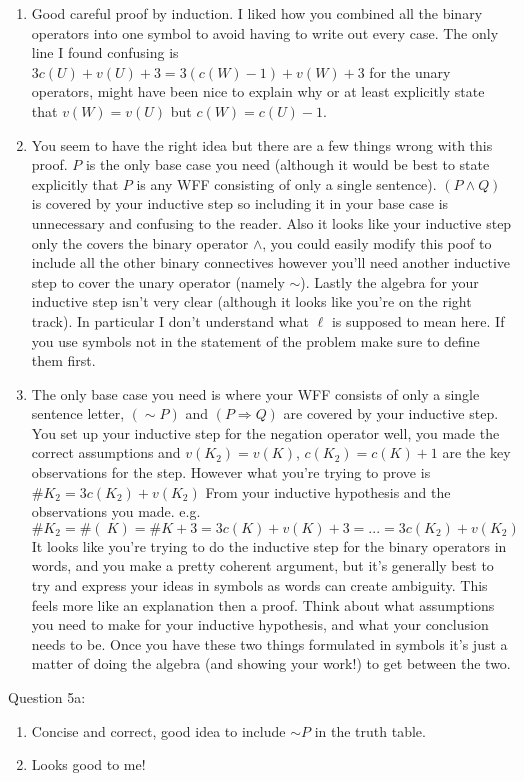 \documentclass[11pt] {article}
\begin{document}
\begin{enumerate}
\item Good careful proof by induction. I liked how you combined all the binary operators into one symbol to avoid having to write out every case. The only line I found confusing is $3c(U) + v(U) + 3 = 3(c(W)-1) + v(W) + 3$ for the unary operators, might have been nice to explain why or at least explicitly state that $v(W) = v(U)$ but $c(W) = c(U) - 1$.
\item You seem to have the right idea but there are a few things wrong with this proof. $P$ is the only base case you need (although it would be best to state explicitly that $P$ is any WFF consisting of only a single sentence). $(P \land Q)$ is covered by your inductive step so including it in your base case is unnecessary and confusing to the reader. Also it looks like your inductive step only the covers the binary operator $\land$, you could easily modify this poof to include all the other binary connectives however you'll need another inductive step to cover the unary operator (namely $\sim$). Lastly the algebra for your inductive step isn't very clear (although it looks like you're on the right track). In particular I don't understand what $\ell$ is supposed to mean here. If you use symbols not in the statement of the problem make sure to define them first.
\item The only base case you need is where your WFF consists of only a single sentence letter, $(\sim P)$ and $(P\Rightarrow Q)$ are covered by your inductive step. You set up your inductive step for the negation operator well, you made the correct assumptions and $v(K_2) = v(K) $, $c(K_2) = c(K) +1$ are the key observations for the step. However what you're trying to prove is $\#K_2 = 3c(K_2) + v(K_2)$ From your inductive hypothesis and the observations you made. e.g. $$ \#K_2 = \#(~K) = \#K + 3 = 3c(K) + v(K) + 3 = ... = 3c(K_2) + v(K_2) $$ It looks like you're trying to do the inductive step for the binary operators in words, and you make a pretty coherent argument, but it's generally best to try and express your ideas in symbols as words can create ambiguity. This feels more like an explanation then a proof. Think about what assumptions you need to make for your inductive hypothesis, and what your conclusion needs to be. Once you have these two things formulated in symbols it's just a matter of doing the algebra (and showing your work!) to get between the two.
\end{enumerate}
Question 5a:
\begin{enumerate}
\item Concise and correct, good idea to include $\sim P$ in the truth table.
\item Looks good to me!
\end{enumerate}
\end{document}
